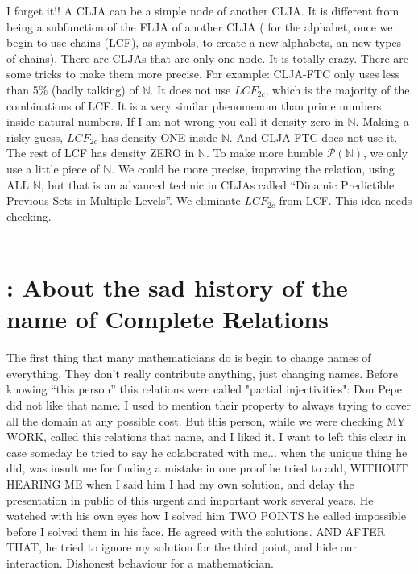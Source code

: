		\noindent
		I forget it!! A CLJA can be a simple node of another CLJA. It is different from being a subfunction of the FLJA of another CLJA ( for the alphabet, once we begin to use chains (LCF), as symbols, to create a new alphabets, an new types of chains). There are CLJAs that are only one node. It is totally crazy. There are some tricks to make them more precise. For example: CLJA-FTC only uses less than 5\% (badly talking) of $\mathbb{N}$. It does not use $LCF_{2c}$, which is the majority of the combinations of LCF. It is a very similar phenomenom than prime numbers inside natural numbers. If I am not wrong you call it density zero in $\mathbb{N}$. Making a risky guess, $LCF_{2c}$ has density ONE inside $\mathbb{N}$. And CLJA-FTC does not use it. The rest of LCF has density ZERO in $\mathbb{N}$. To make more humble $\mathcal{P}(\mathbb{N})$, we only use a little piece of $\mathbb{N}$. We could be more precise, improving the relation, using ALL $\mathbb{N}$, but that is an advanced technic in CLJAs called ``Dinamic Predictible Previous Sets in Multiple Levels''. We eliminate $LCF_{2c}$ from LCF. This idea needs checking.
		\\\\
	
	\section{\:: About the sad history of the name of Complete Relations}
	
		\noindent
		The first thing that many mathematicians do is begin to change names of everything. They don't really contribute anything, just changing names. Before knowing ``this person'' this relations were called "partial injectivities": Don Pepe did not like that name. I used to mention their property to always trying to cover all the domain at any possible cost. But this person, while we were checking MY WORK, called this relations that name, and I liked it. I want to left this clear in case someday he tried to say he colaborated with me... when the unique thing he did, was insult me for finding a mistake in one proof he tried to add, WITHOUT HEARING ME when I said him I had my own solution, and delay the presentation in public of this urgent and important work several years. He watched with his own eyes how I solved him TWO POINTS he called impossible before I solved them in his face. He agreed with the solutions. AND AFTER THAT, he tried to ignore my solution for the third point, and hide our interaction. Dishonest behaviour for a mathematician.
		\\\\
		
